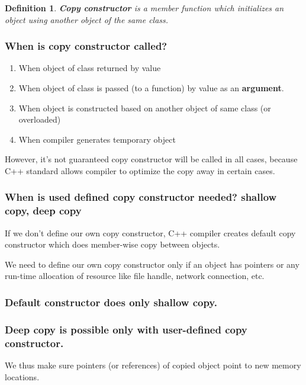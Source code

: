 \documentclass[10pt]{amsart}
\newtheorem{definition}{Definition}
\begin{document}
\begin{multicols*}{2}
\begin{definition}
	\textbf{Copy constructor} is a member function which initializes an object using another object of the same class.  
\end{definition}

\subsubsection{When is copy constructor called? } 
\begin{enumerate}
\item When object of class returned by value 
\item When object of class is passed (to a function) by value as an \textbf{argument}.  
\item When object is constructed based on another object of same class  (or overloaded)  
\item When compiler generates temporary object  
\end{enumerate}


However, it's not guaranteed copy constructor will be called in all cases, because C++ standard allows compiler to optimize the copy away in certain cases.  

\subsubsection{When is used defined copy constructor needed?  shallow copy, deep copy}  

If we don't define our own copy constructor, C++ compiler creates default copy constructor which does member-wise copy between objects.  

We need to define our own copy constructor only if an object has pointers or any run-time allocation of resource like file handle, network connection, etc.  

\subsubsection{Default constructor does only shallow copy.}  

\subsubsection{Deep copy is possible only with user-defined copy constructor.}  

We thus make sure pointers (or references) of copied object point to new memory locations.  


\end{multicols*}
\end{document}
